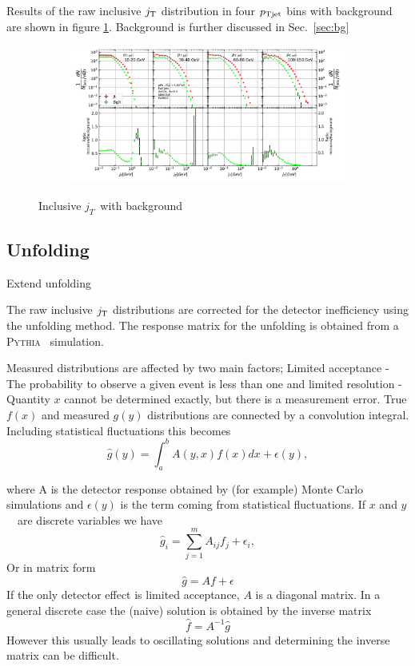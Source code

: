 Results of the raw inclusive $j_{\rm T}$ distribution in four $p_{\rm Tjet}$ bins with background are shown in figure \ref{fig:inclusive}. Background is further discussed in Sec.~\ref{sec:bg}
 
 \begin{figure}
\centering
\begin{subfigure}{0.95\textwidth}
\includegraphics[width=\textwidth]{results/MixedFullJetsR04JetConeJtInclusive.pdf}
\end{subfigure}
\caption{Inclusive $j_T$ with background}
\label{fig:inclusive}
\end{figure}
 
 
 
 \subsection{Unfolding}
{\color{red} Extend unfolding}
 
The raw inclusive $j_{\rm T}$ distributions are corrected for the detector inefficiency using the unfolding method. The response matrix for the unfolding is obtained from a \textsc{Pythia}~\cite{introPythia81} simulation.
 
 
Measured distributions are affected by two main factors; Limited acceptance - The probability to observe a given event is less than one and limited resolution - Quantity $x$ cannot be determined exactly, but there is a measurement error. True $f(x)$ and measured $g(y)$ distributions are connected by a convolution integral. Including statistical fluctuations this becomes
$$\hat g(y) = \int_a^b A\left(y,x\right) f(x) dx + \epsilon(y),$$

where A is the detector response obtained by (for example) Monte Carlo simulations and $\epsilon(y)$ is the term coming from statistical fluctuations.
If $x$ and $y$~ are discrete variables we have
$$\hat g_i = \sum_{j=1}^m A_{ij}f_j+\epsilon_i,$$
Or in matrix form
$$\hat g = Af+\epsilon$$
If the only detector effect is limited acceptance, $A$ is a diagonal matrix. In a general discrete case the (naive) solution is obtained by the inverse matrix
$$\hat f = A^{-1}\hat g $$
However this usually leads to oscillating solutions and determining the inverse matrix can be difficult.

